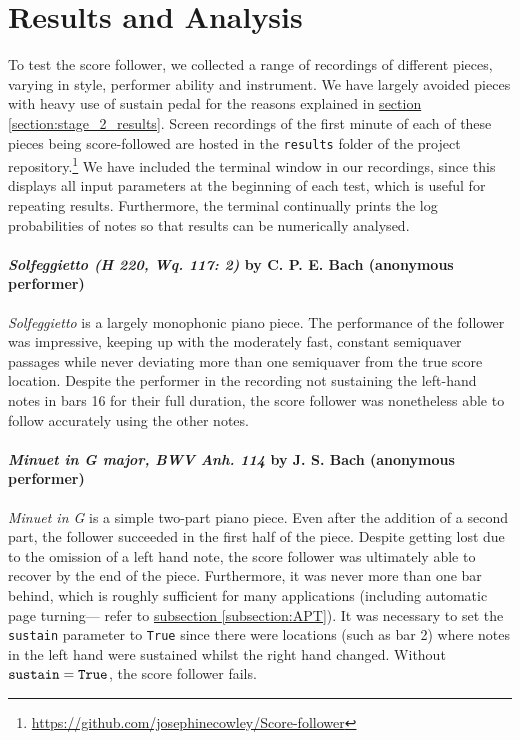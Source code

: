 \chapter{Results and Analysis}{\label{ch:results}}
To test the score follower, we collected a range of recordings of different pieces, varying in style, performer ability and instrument. We have largely avoided pieces with heavy use of \gls{sustain pedal} for the reasons explained in \hyperref[section:stage_2_results]{section \ref*{section:stage_2_results}}. Screen recordings of the first minute of each of these pieces being score-followed are hosted in the \verb|results| folder of the project repository.\footnote{\href{https://github.com/josephinecowley/Score-follower}{https://github.com/josephinecowley/Score-follower}} We have included the terminal window in our recordings, since this displays all input parameters at the beginning of each test, which is useful for repeating results. Furthermore, the terminal continually prints the log probabilities of notes so that results can be numerically analysed.

\subsubsection{\textit{Solfeggietto (H 220, Wq. 117: 2)} by C. P. E. Bach (anonymous performer)}
\textit{Solfeggietto} is a largely \gls{monophonic} piano piece. The performance of the follower was impressive, keeping up with the moderately fast, constant \gls{semiquaver} passages while never deviating more than one semiquaver from the true score location. Despite the performer in the recording not sustaining the left-hand notes in \gls{bars} 16 for their full duration, the score follower was nonetheless able to follow accurately using the other notes.  

\subsubsection{\textit{Minuet in G major, BWV Anh. 114} by J. S. Bach (anonymous performer)}
\textit{Minuet in G} is a simple two-part piano piece. Even after the addition of a second part, the follower succeeded in the first half of the piece. Despite getting lost due to the omission of a left hand note, the score follower was ultimately able to recover by the end of the piece. Furthermore, it was never more than one bar behind, which is roughly sufficient for many applications (including automatic page turning— refer to \hyperref[subsection:APT]{subsection \ref*{subsection:APT}}).  It was necessary to set the \verb|sustain| parameter to \verb|True| since there were locations (such as bar 2) where notes in the left hand were sustained whilst the right hand changed. Without $\verb|sustain|=\verb|True|$, the score follower fails. 

